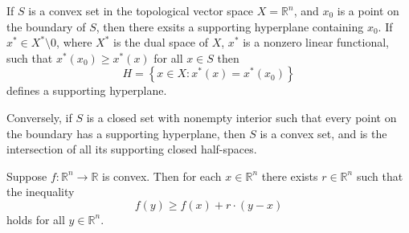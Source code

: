 %
\begin{theorem}
  \label{theorem-supporting-hyperplane-theorem}
  If \( S \) is a convex set in the topological vector space \( X = \mathbb{R}^n \), and \( x_0 \) is a point on the boundary of \( S \), then there exsits a supporting hyperplane containing \( x_0 \).
  If \( x^* \in X^* \setminus 0 \), where \( X^* \) is the dual space of \( X \), \( x^* \) is a nonzero linear functional, such that \( x^*(x_0) \geq x^*(x) \) for all \( x \in S \) then
  \[
    H = \left\lbrace x \in X: x^*(x) = x^*(x_0) \right\rbrace
  \]
  defines a supporting hyperplane.

  Conversely, if \( S \) is a closed set with nonempty interior such that every point on the boundary has a supporting hyperplane, then \( S \) is a convex set, and is the intersection of all its supporting closed half-spaces.
\end{theorem}
%


\begin{theorem}
  \label{theorem-supporting-hyperplanes}
  Suppose \( f: \mathbb{R}^n \to \mathbb{R} \) is convex.
  Then for each \( x \in \mathbb{R}^n \) there exists \( r \in \mathbb{R}^n \) such that the inequality
  \[
    f(y) \geq f(x) + r \cdot (y - x)
  \]
  holds for all \( y \in \mathbb{R}^n \).
\end{theorem}


